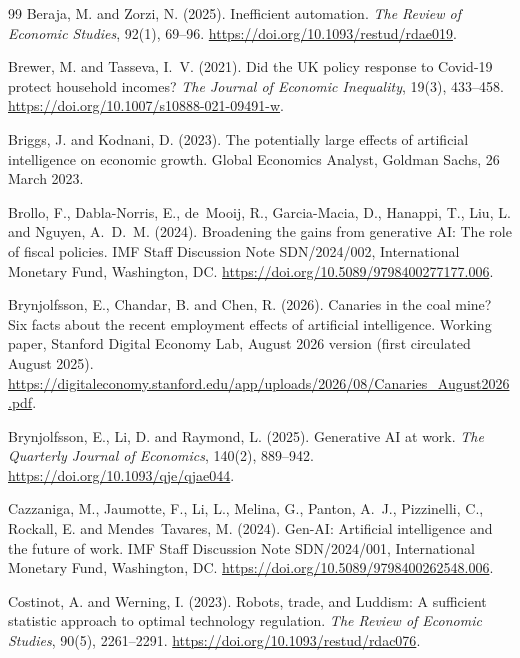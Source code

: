\begin{thebibliography}{99}
Beraja, M. and Zorzi, N. (2025).
\newblock Inefficient automation.
\newblock \emph{The Review of Economic Studies}, 92(1), 69--96.
\newblock \url{https://doi.org/10.1093/restud/rdae019}.

Brewer, M. and Tasseva, I.~V. (2021).
\newblock Did the UK policy response to Covid-19 protect household incomes?
\newblock \emph{The Journal of Economic Inequality}, 19(3), 433--458.
\newblock \url{https://doi.org/10.1007/s10888-021-09491-w}.

Briggs, J. and Kodnani, D. (2023).
\newblock The potentially large effects of artificial intelligence on economic growth.
\newblock Global Economics Analyst, Goldman Sachs, 26 March 2023.

Brollo, F., Dabla-Norris, E., de~Mooij, R., Garcia-Macia, D., Hanappi, T., Liu, L. and Nguyen, A.~D.~M. (2024).
\newblock Broadening the gains from generative AI: The role of fiscal policies.
\newblock IMF Staff Discussion Note SDN/2024/002, International Monetary Fund, Washington, DC.
\newblock \url{https://doi.org/10.5089/9798400277177.006}.

Brynjolfsson, E., Chandar, B. and Chen, R. (2026).
\newblock Canaries in the coal mine? Six facts about the recent employment effects of artificial intelligence.
\newblock Working paper, Stanford Digital Economy Lab, August 2026 version (first circulated August 2025).
\newblock \url{https://digitaleconomy.stanford.edu/app/uploads/2026/08/Canaries_August2026.pdf}.

Brynjolfsson, E., Li, D. and Raymond, L. (2025).
\newblock Generative AI at work.
\newblock \emph{The Quarterly Journal of Economics}, 140(2), 889--942.
\newblock \url{https://doi.org/10.1093/qje/qjae044}.

Cazzaniga, M., Jaumotte, F., Li, L., Melina, G., Panton, A.~J., Pizzinelli, C., Rockall, E. and Mendes~Tavares, M. (2024).
\newblock Gen-AI: Artificial intelligence and the future of work.
\newblock IMF Staff Discussion Note SDN/2024/001, International Monetary Fund, Washington, DC.
\newblock \url{https://doi.org/10.5089/9798400262548.006}.

Costinot, A. and Werning, I. (2023).
\newblock Robots, trade, and Luddism: A sufficient statistic approach to optimal technology regulation.
\newblock \emph{The Review of Economic Studies}, 90(5), 2261--2291.
\newblock \url{https://doi.org/10.1093/restud/rdac076}.


\end{thebibliography}
